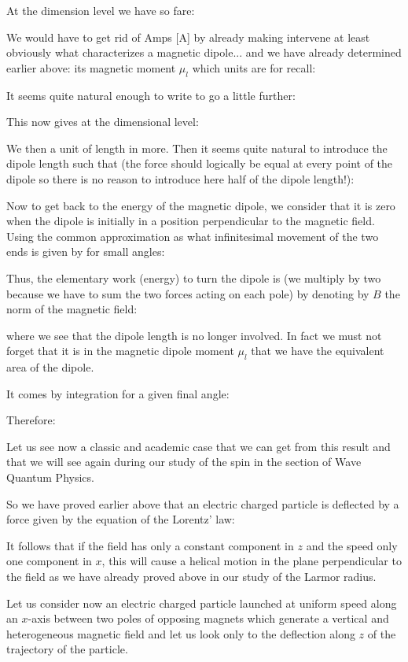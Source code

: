 	At the dimension level we have so fare:
	
	We would have to get rid of Amps [A] by already making intervene at least obviously what characterizes a magnetic dipole... and we have already determined earlier above: its magnetic moment $\mu_l$ which units are for recall:
	
	It seems quite natural enough to write to go a little further:
	
	This now gives at the dimensional level:
	
	We then a unit of length in more. Then it seems quite natural to introduce the dipole length such that (the force should logically be equal at every point of the dipole so there is no reason to introduce here half of the dipole length!):
	
	Now to get back to the energy of the magnetic dipole, we consider that it is zero when the dipole is initially in a position perpendicular to the magnetic field. Using the common approximation as what infinitesimal movement of the two ends is given by for small angles:
	
	Thus, the elementary work (energy) to turn the dipole is (we multiply by two because we have to sum the two forces acting on each pole) by denoting by $B$ the norm of the magnetic field:
	
	where we see that the dipole length is no longer involved. In fact we must not forget that it is in the magnetic dipole moment $\mu_l$ that we have the equivalent area of the dipole.

	It comes by integration for a given final angle:
	
	Therefore:
	
	Let us see now a classic and academic case that we can get from this result and that we will see again during our study of the spin in the section of Wave Quantum Physics.

	So we have proved earlier above that an electric charged particle is deflected by a force given by the equation of the Lorentz' law:
	
	It follows that if the field has only a constant component in $z$ and the speed only one component in $x$, this will cause a helical motion in the plane perpendicular to the field as we have already proved above in our study of the Larmor radius.

	Let us consider now an electric charged particle launched at uniform speed along an $x$-axis between two poles of opposing magnets which generate a vertical and heterogeneous magnetic field and let us look only to the deflection along $z$ of the trajectory of the particle.
	
